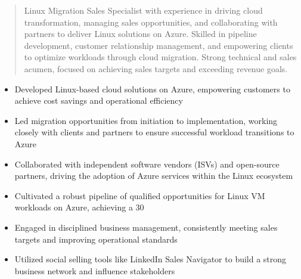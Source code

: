 



\makecvheader

\begin{quote}
  \noindent
  Linux Migration Sales Specialist with experience in driving cloud transformation, managing sales opportunities, and collaborating with partners to deliver Linux solutions on Azure. Skilled in pipeline development, customer relationship management, and empowering clients to optimize workloads through cloud migration. Strong technical and sales acumen, focused on achieving sales targets and exceeding revenue goals.
\end{quote}

\par\smallskip
\noindent
\begin{minipage}{20cm}
  \begin{minipage}{9.75cm}
    \begin{itemize}
      \item Developed Linux-based cloud solutions on Azure, empowering customers to achieve cost savings and operational efficiency
      \item Led migration opportunities from initiation to implementation, working closely with clients and partners to ensure successful workload transitions to Azure
      \item Collaborated with independent software vendors (ISVs) and open-source partners, driving the adoption of Azure services within the Linux ecosystem
    \end{itemize}
  \end{minipage}
  \hfill
  \begin{minipage}{9.75cm}
    \begin{itemize}
      \item Cultivated a robust pipeline of qualified opportunities for Linux VM workloads on Azure, achieving a 30%
      \item Engaged in disciplined business management, consistently meeting sales targets and improving operational standards
      \item Utilized social selling tools like LinkedIn Sales Navigator to build a strong business network and influence stakeholders
    \end{itemize}
  \end{minipage}
\end{minipage}
\par\smallskip
\divider

